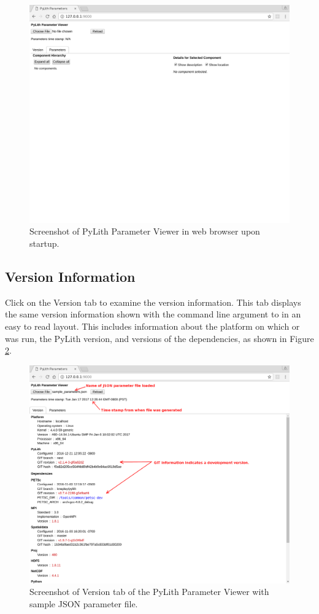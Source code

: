 \begin{figure}[htbp]
  \includegraphics[width=5in]{runpylith/figs/paramgui_startup} 
  \caption{Screenshot of PyLith Parameter Viewer in web browser upon startup.}
  \label{fig:parameters:gui:startup} 
\end{figure}


\subsection{Version Information}

Click on the \textsf{Version} tab to examine the version information.
This tab displays the same version information shown with the
 command line argument to  in
an easy to read layout.  This includes information about the platform
on which  or  was run, the
PyLith version, and versions of the dependencies, as shown in Figure
\ref{fig:parameters:gui:version}.

\begin{figure}[htbp]
  \includegraphics[width=5in]{runpylith/figs/paramgui_version} 
  \caption{Screenshot of \textsf{Version} tab of the PyLith Parameter Viewer
    with sample JSON parameter file.}
  \label{fig:parameters:gui:version} 
\end{figure}


